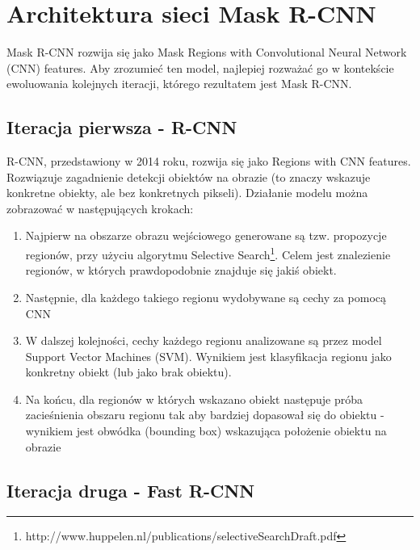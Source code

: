 \section{Architektura sieci Mask R-CNN}
\label{sec:architekrura_mask_rcnn}

Mask R-CNN rozwija się jako Mask Regions with Convolutional Neural Network (CNN) features.
Aby zrozumieć ten model, najlepiej rozważać go w kontekście ewoluowania kolejnych iteracji, którego rezultatem jest Mask R-CNN.

\subsection{Iteracja pierwsza - R-CNN}


R-CNN, przedstawiony w 2014 roku, rozwija się jako Regions with CNN features.
Rozwiązuje zagadnienie detekcji obiektów na obrazie (to znaczy wskazuje konkretne obiekty, ale bez konkretnych pikseli).
Działanie modelu można zobrazować w następujących krokach:

\begin{enumerate}
  \item Najpierw na obszarze obrazu wejściowego generowane są tzw. propozycje regionów, przy użyciu algorytmu Selective Search\footnote{http://www.huppelen.nl/publications/selectiveSearchDraft.pdf}.
        Celem jest znalezienie regionów, w których prawdopodobnie znajduje się jakiś obiekt.
	\item Następnie, dla każdego takiego regionu wydobywane są cechy za pomocą CNN
  \item W dalszej kolejności, cechy każdego regionu analizowane są przez model Support Vector Machines (SVM).
        Wynikiem jest klasyfikacja regionu jako konkretny obiekt (lub jako brak obiektu).
	\item Na końcu, dla regionów w których wskazano obiekt następuje próba zacieśnienia obszaru regionu tak aby bardziej dopasował się do obiektu - wynikiem jest obwódka (bounding box) wskazująca położenie obiektu na obrazie
\end{enumerate}

\subsection{Iteracja druga - Fast R-CNN}



